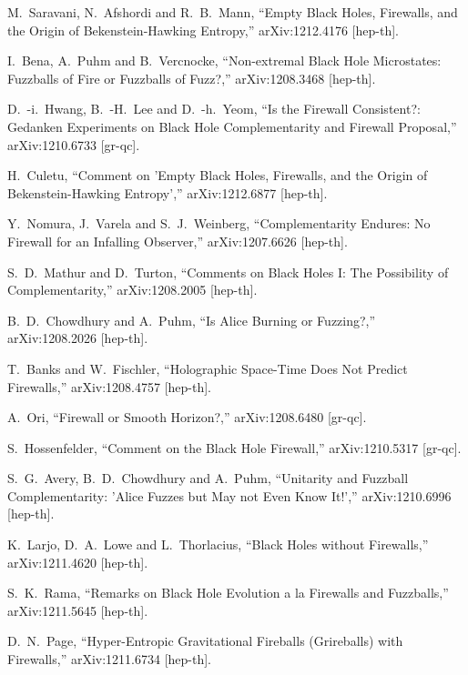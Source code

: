 \documentclass[12pt]{article}
\begin{document}
\begin{thebibliography}{99}
  M.~Saravani, N.~Afshordi and R.~B.~Mann,
  ``Empty Black Holes, Firewalls, and the Origin of Bekenstein-Hawking Entropy,''
  arXiv:1212.4176 [hep-th].

  I.~Bena, A.~Puhm and B.~Vercnocke,
  ``Non-extremal Black Hole Microstates: Fuzzballs of Fire or Fuzzballs of Fuzz?,''
  arXiv:1208.3468 [hep-th].

  D.~-i.~Hwang, B.~-H.~Lee and D.~-h.~Yeom,
  ``Is the Firewall Consistent?: Gedanken Experiments on Black Hole Complementarity and Firewall Proposal,''
  arXiv:1210.6733 [gr-qc].

  H.~Culetu,
  ``Comment on 'Empty Black Holes, Firewalls, and the Origin of Bekenstein-Hawking Entropy',''
  arXiv:1212.6877 [hep-th].
  
  Y.~Nomura, J.~Varela and S.~J.~Weinberg,
  ``Complementarity Endures: No Firewall for an Infalling Observer,''
  arXiv:1207.6626 [hep-th].  
  
  S.~D.~Mathur and D.~Turton,
  ``Comments on Black Holes I: The Possibility of Complementarity,''
  arXiv:1208.2005 [hep-th].  
  
  B.~D.~Chowdhury and A.~Puhm,
  ``Is Alice Burning or Fuzzing?,''
  arXiv:1208.2026 [hep-th].

  T.~Banks and W.~Fischler,
  ``Holographic Space-Time Does Not Predict Firewalls,''
  arXiv:1208.4757 [hep-th].  

  A.~Ori,
  ``Firewall or Smooth Horizon?,''
  arXiv:1208.6480 [gr-qc].    

  S.~Hossenfelder,
  ``Comment on the Black Hole Firewall,''
  arXiv:1210.5317 [gr-qc].

  S.~G.~Avery, B.~D.~Chowdhury and A.~Puhm,
  ``Unitarity and Fuzzball Complementarity: 'Alice Fuzzes but May not Even Know It!',''
  arXiv:1210.6996 [hep-th].

  K.~Larjo, D.~A.~Lowe and L.~Thorlacius,
  ``Black Holes without Firewalls,''
  arXiv:1211.4620 [hep-th].

  S.~K.~Rama,
  ``Remarks on Black Hole Evolution a la Firewalls and Fuzzballs,''
  arXiv:1211.5645 [hep-th].

  D.~N.~Page,
  ``Hyper-Entropic Gravitational Fireballs (Grireballs) with Firewalls,''
  arXiv:1211.6734 [hep-th].


\end{thebibliography}
\end{document}
